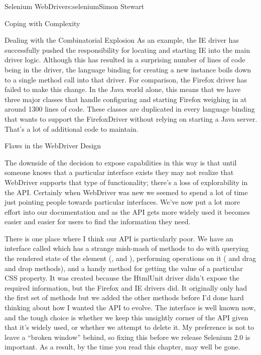 \begin{aosachapter}{Selenium WebDriver}{s:selenium}{Simon Stewart}
\begin{aosasect1}{Coping with Complexity}
\begin{aosasect2}{Dealing with the Combinatorial Explosion}
As an example, the IE driver has successfully pushed the
responsibility for locating and starting IE into the main driver
logic. Although this has resulted in a surprising number of lines of
code being in the driver, the language binding for creating a new
instance boils down to a single method call into that driver. For
comparison, the Firefox driver has failed to make this change. In the
Java world alone, this means that we have three major classes that
handle configuring and starting Firefox weighing in at around 1300
lines of code. These classes are duplicated in every language binding
that wants to support the FirefoxDriver without relying on starting a
Java server. That's a lot of additional code to maintain.

\end{aosasect2}

\begin{aosasect2}{Flaws in the WebDriver Design}

The downside of the decision to expose capabilities in this way is
that until someone knows that a particular interface exists they may
not realize that WebDriver supports that type of functionality;
there's a loss of explorability in the API\@. Certainly when WebDriver
was new we seemed to spend a lot of time just pointing people towards
particular interfaces. We've now put a lot more effort into our
documentation and as the API gets more widely used it becomes easier
and easier for users to find the information they need.

There is one place where I think our API is particularly poor. We have
an interface called  which has a strange
mish-mash of methods to do with querying the rendered state of the
element (,  and ),
performing operations on it ( and drag and drop methods),
and a handy method for getting the value of a particular CSS
property. It was created because the HtmlUnit driver didn't expose the
required information, but the Firefox and IE drivers did. It
originally only had the first set of methods but we added the other
methods before I'd done hard thinking about how I wanted the API to
evolve. The interface is well known now, and the tough choice is
whether we keep this unsightly corner of the API given that it's
widely used, or whether we attempt to delete it. My preference is not
to leave a ``broken window'' behind, so fixing this before we release
Selenium 2.0 is important.
As a result, by the time you read this chapter,
 may well be gone.


\end{aosasect2}
\end{aosasect1}
\end{aosachapter}
